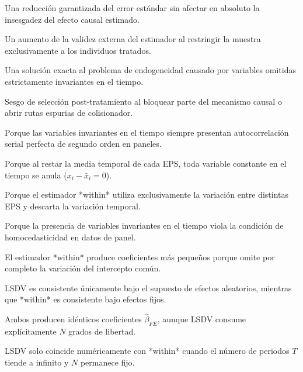 \begin{opts}
    \item Una reducción garantizada del error estándar sin afectar en absoluto la insesgadez del efecto causal estimado.
    \item Un aumento de la validez externa del estimador al restringir la muestra exclusivamente a los individuos tratados.
    \item Una solución exacta al problema de endogeneidad causado por variables omitidas estrictamente invariantes en el tiempo.
    \item Sesgo de selección post-tratamiento al bloquear parte del mecanismo causal o abrir rutas espurias de colisionador.
\end{opts}

\begin{opts}
    \item Porque las variables invariantes en el tiempo siempre presentan autocorrelación serial perfecta de segundo orden en paneles.
    \item Porque al restar la media temporal de cada EPS, toda variable constante en el tiempo se anula ($x_i - \bar{x}_i = 0$).
    \item Porque el estimador *within* utiliza exclusivamente la variación entre distintas EPS y descarta la variación temporal.
    \item Porque la presencia de variables invariantes en el tiempo viola la condición de homocedasticidad en datos de panel.
\end{opts}

\begin{opts}
    \item El estimador *within* produce coeficientes más pequeños porque omite por completo la variación del intercepto común.
    \item LSDV es consistente únicamente bajo el supuesto de efectos aleatorios, mientras que *within* es consistente bajo efectos fijos.
    \item Ambos producen idénticos coeficientes $\hat{\beta}_{FE}$, aunque LSDV consume explícitamente $N$ grados de libertad.
    \item LSDV solo coincide numéricamente con *within* cuando el número de periodos $T$ tiende a infinito y $N$ permanece fijo.
\end{opts}

